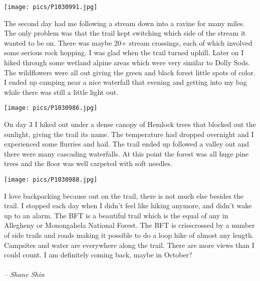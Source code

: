 \documentclass[10pt,a4paper]{article}
\newenvironment{Figure}
  {\par\medskip\noindent\minipage{\linewidth}}
  {\endminipage\par\medskip}
\begin{document}
\begin{multicols}{2}
\begin{Figure}
 \centering
 \texttt{[image: pics/P1030991.jpg]}
\end{Figure}

The second day had me following a stream down into a ravine for many miles.  The only problem was that the trail kept switching which side of the stream it wanted to be on.  There was maybe 20+ stream crossings, each of which involved some serious rock hopping.  I was glad when the trail turned uphill.  Later on I hiked through some wetland alpine areas which were very similar to Dolly Sods.  The wildflowers were all out giving the green and black forest little spots of color. I ended up camping near a nice waterfall that evening and getting into my bag while there was still a little light out.

\begin{Figure}
 \centering
 \texttt{[image: pics/P1030986.jpg]}
\end{Figure}

On day 3 I hiked out under a dense canopy of Hemlock trees that blocked out the sunlight, giving the trail its name.  The temperature had dropped overnight and I experienced some flurries and hail. The trail ended up followed a valley out and there were many cascading waterfalls. At this point the forest was all huge pine trees and the floor was well carpeted with soft needles.

\begin{Figure}
 \centering
 \texttt{[image: pics/P1030988.jpg]}
\end{Figure}

I love backpacking because out on the trail, there is not much else besides the trail. I stopped each day when I didn't feel like hiking anymore, and didn't wake up to an alarm. The BFT is a beautiful trail which is the equal of any in Allegheny or Monongahela National Forest. The BFT is crisscrossed by a number of side trails and roads making it possible to do a loop hike of almost any length. Campsites and water are everywhere along the trail. There are more views than I could count. I am definitely coming back, maybe in October?\\
\\
\textit{-- Shane Shin}

\clearpage
\pagebreak



\end{multicols}
\end{document}
